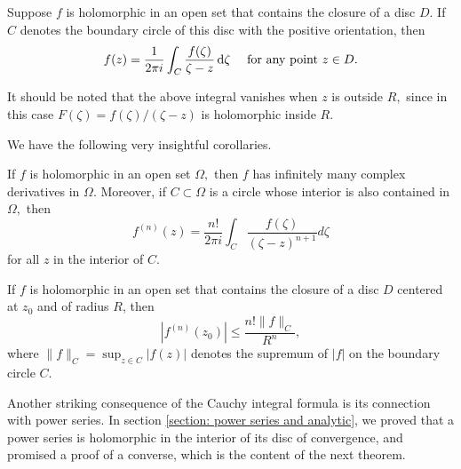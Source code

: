 \documentclass{chapter}
\begin{document}
            \begin{theorem}
                Suppose $f$ is holomorphic in an open set that contains the closure of a disc $D$. If $C$ denotes the boundary circle of this disc with the positive orientation, then \[f(z)=\frac{1}{2 \pi i} \int_{C} \frac{f(\zeta)}{\zeta-z} \mathop{}\!\mathrm{d} \zeta \quad \text { for any point } z \in D.\]
            \end{theorem}
            \begin{remark}
                It should be noted that the above integral vanishes when $z$ is outside $R,$ since in this case $F(\zeta)=f(\zeta) /(\zeta-z)$ is holomorphic inside $R$.
            \end{remark}

            We have the following very insightful corollaries.
            \begin{corollary}
                If $f$ is holomorphic in an open set $\Omega,$ then $f$ has infinitely many complex derivatives in $\Omega$. Moreover, if $C \subset \Omega$ is a circle whose interior is also contained in $\Omega,$ then \[f^{(n)}(z)=\frac{n !}{2 \pi i} \int_{C} \frac{f(\zeta)}{(\zeta-z)^{n+1}} d \zeta\] for all $z$ in the interior of $C$.
            \end{corollary}

            \begin{corollary}
                If $f$ is holomorphic in an open set that contains the closure of a disc $D$ centered at $z_0$ and of radius $R$, then \[\left|f^{(n)}\left(z_{0}\right)\right| \leq \frac{n !\|f\|_{C}}{R^{n}},\] where $\|f\|_{C}=\sup _{z \in C}|f(z)|$ denotes the supremum of $|f|$ on the boundary circle $C$.
            \end{corollary}

            Another striking consequence of the Cauchy integral formula is its connection with power series. In section \ref{section: power series and analytic}, we proved that a power series is holomorphic in the interior of its disc of convergence, and promised a proof of a converse, which is the content of the next theorem.
            
\end{document}
